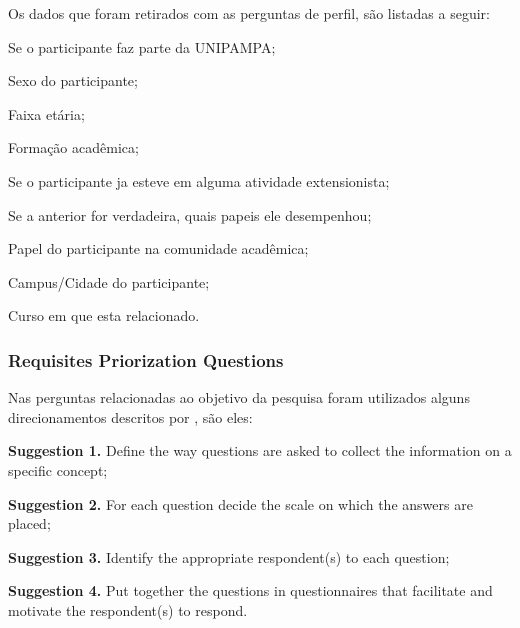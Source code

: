 Os dados que foram retirados com as perguntas de perfil, são listadas a seguir:
\begin{inparaenum}[(1)]
  \item Se o participante faz parte da \ac{UNIPAMPA};
  \item Sexo do participante;
  \item Faixa etária;
  \item Formação acadêmica;
  \item Se o participante ja esteve em alguma atividade extensionista;
  \item Se a anterior for verdadeira, quais papeis ele desempenhou;
  \item Papel do participante na comunidade acadêmica;
  \item Campus/Cidade do participante;
  \item Curso em que esta relacionado.
\end{inparaenum}

\subsubsection{Requisites Priorization Questions}
Nas perguntas relacionadas ao objetivo da pesquisa foram utilizados alguns direcionamentos descritos por , são eles:
\begin{description}
  \item \textbf{Suggestion 1.} Define the way questions are asked to collect the information on a specific concept;\label{suggestion:1}
  \item \textbf{Suggestion 2.} For each question decide the scale on which the answers are placed;\label{suggestion:2}
  \item \textbf{Suggestion 3.} Identify the appropriate respondent(s) to each question;\label{suggestion:3}
  \item \textbf{Suggestion 4.} Put together the questions in questionnaires that facilitate and motivate the respondent(s) to respond.\label{suggestion:4}
\end{description}

